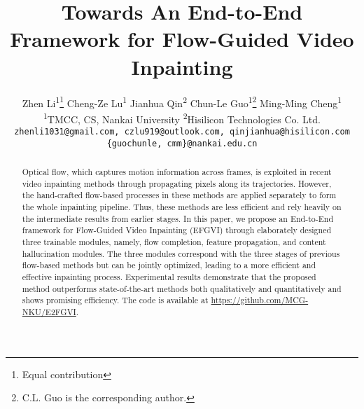 \documentclass[final]{cvpr}
\newcommand{\methodname}{EFGVI}
\newcommand*\samethanks[1][\value{footnote}]{\footnotemark[#1]}
\begin{document}
\title{Towards An End-to-End Framework for Flow-Guided Video Inpainting}

\author{
  Zhen Li\textsuperscript{1}\thanks{Equal contribution} \quad
  Cheng-Ze Lu\textsuperscript{1}\samethanks \quad
  Jianhua Qin\textsuperscript{2} \quad
  Chun-Le Guo\textsuperscript{1}\thanks{C.L. Guo is the corresponding author.} \quad
  Ming-Ming Cheng\textsuperscript{1} \\
  \textsuperscript{1}TMCC, CS, Nankai University  \quad
  \textsuperscript{2}Hisilicon Technologies Co. Ltd. \\
  {\tt\small
    zhenli1031@gmail.com,
    czlu919@outlook.com,
    qinjianhua@hisilicon.com
  } \\
  {\tt\small
  \{guochunle, cmm\}@nankai.edu.cn
  }
}


\maketitle


\begin{abstract}
    Optical flow, which captures motion information across frames, is exploited in recent video inpainting methods through propagating pixels along its trajectories. 
However, the hand-crafted flow-based processes in these methods are applied separately to form the whole inpainting pipeline.
Thus, these methods are less efficient and rely heavily on the intermediate results from earlier stages.
In this paper, we propose an End-to-End framework for Flow-Guided Video Inpainting (\methodname) through elaborately designed three trainable modules, 
    namely, flow completion, feature propagation, and content hallucination modules.
The three modules correspond with the three stages of previous flow-based methods but can be jointly optimized, leading to a more efficient and effective inpainting process.
Experimental results demonstrate that the proposed method outperforms state-of-the-art methods both qualitatively and quantitatively and shows promising efficiency. 
The code is available at \url{https://github.com/MCG-NKU/E2FGVI}.
    \vspace{-5mm}
\end{abstract} 
\end{document}
